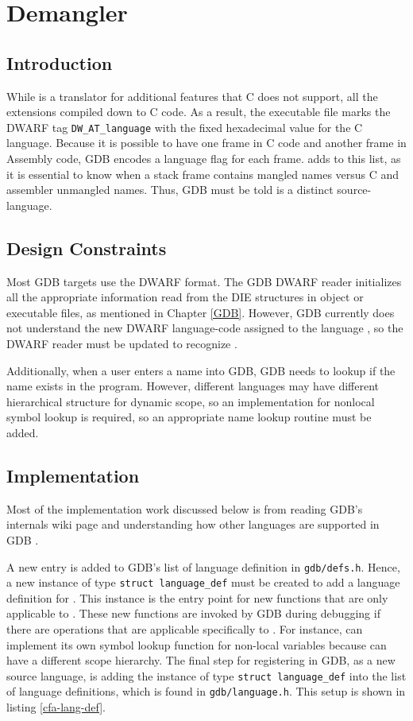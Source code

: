 \chapter{\CFAS Demangler} \label{demangler}

\section{Introduction}
While \CFAS is a translator for additional features that C does not support,
all the extensions compiled down to C code.  As a result, the executable file
marks the DWARF tag \verb|DW_AT_language| with the fixed hexadecimal value for
the C language. Because it is possible to have one frame in C code and another
frame in Assembly code, GDB encodes a language flag for each frame. \CFAS adds
to this list, as it is essential to know when a stack frame contains mangled
names versus C and assembler unmangled names. Thus, GDB must be told \CFAS is a
distinct source-language.

\section{Design Constraints}
Most GDB targets use the DWARF format.  The GDB DWARF reader initializes all
the appropriate information read from the DIE structures in object or
executable files, as mentioned in Chapter \ref{GDB}. However, GDB currently
does not understand the new DWARF language-code assigned to the language \CFA,
so the DWARF reader must be updated to recognize \CFA.

Additionally, when a user enters a name into GDB, GDB needs to lookup if the
name exists in the program. However, different languages may have different
hierarchical structure for dynamic scope, so an implementation for nonlocal
symbol lookup is required, so an appropriate name lookup routine must be added.

\section{Implementation}
Most of the implementation work discussed below is from reading GDB's internals
wiki page and understanding how other languages are supported in GDB \cite{Reference5}.

A new entry is added to GDB's list of language definition in
\verb|gdb/defs.h|. Hence, a new instance of type \verb|struct language_def|
must be created to add a language definition for \CFAS. This instance is the
entry point for new functions that are only applicable to \CFA. These new
functions are invoked by GDB during debugging if there are operations that are
applicable specifically to \CFA. For instance, \CFAS can implement its own
symbol lookup function for non-local variables because \CFAS can have a
different scope hierarchy. The final step for registering \CFAS in GDB, as a
new source language, is adding the instance of type \verb|struct language_def|
into the list of language definitions, which is found in
\verb|gdb/language.h|. This setup is shown in listing \ref{cfa-lang-def}.

